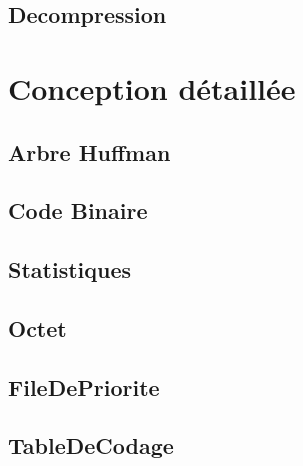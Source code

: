 \documentclass{article}
\begin{document}


\subsection{\textbf{Decompression}}



\newpage

\section{Conception détaillée}

\subsection{\textbf{Arbre Huffman}}



\subsection{\textbf{Code Binaire}}



\subsection{\textbf{Statistiques}}



\subsection{\textbf{Octet}}



\subsection{\textbf{FileDePriorite}}



\subsection{\textbf{TableDeCodage}}


\end{document}

